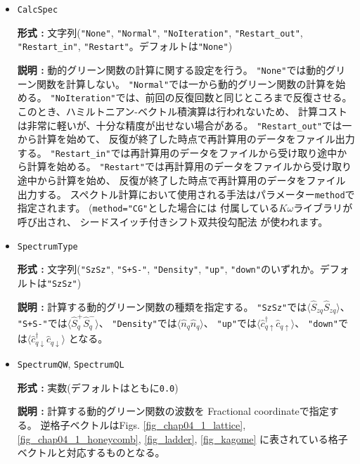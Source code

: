 \begin{itemize}
\item \verb|CalcSpec|
  
  {\bf 形式 :} 文字列(\verb|"None"|, \verb|"Normal"|, \verb|"NoIteration"|,  
  \verb|"Restart_out"|, \verb|"Restart_in"|, \verb|"Restart"|。デフォルトは\verb|"None"|)

  {\bf 説明 :} 動的グリーン関数の計算に関する設定を行う。
  \verb|"None"|では動的グリーン関数を計算しない。
  \verb|"Normal"|では一から動的グリーン関数の計算を始める。
  \verb|"NoIteration"|では、前回の反復回数と同じところまで反復させる。
  このとき、ハミルトニアン-ベクトル積演算は行われないため、
  計算コストは非常に軽いが、十分な精度が出せない場合がある。
  \verb|"Restart_out"|では一から計算を始めて、
  反復が終了した時点で再計算用のデータをファイル出力する。
  \verb|"Restart_in"|では再計算用のデータをファイルから受け取り途中から計算を始める。
  \verb|"Restart"|では再計算用のデータをファイルから受け取り途中から計算を始め、
  反復が終了した時点で再計算用のデータをファイル出力する。
  スペクトル計算において使用される手法はパラメーター\verb|method|で指定されます。
  (\verb|method="CG"|とした場合には
  付属している$K\omega$ライブラリ\cite{komega}が呼び出され、
  シードスイッチ付きシフト双共役勾配法
  \cite{Frommer2003,doi:10.1143/JPSJ.77.114713}が使われます。

\item \verb|SpectrumType|
  
  {\bf 形式 :} 文字列(\verb|"SzSz"|, \verb|"S+S-"|, \verb|"Density"|,  
  \verb|"up"|, \verb|"down"|のいずれか。デフォルトは\verb|"SzSz"|)

  {\bf 説明 :} 計算する動的グリーン関数の種類を指定する。
  \verb|"SzSz"|では$\langle {\hat S}_{z q} {\hat S}_{z q}\rangle$、
  \verb|"S+S-"|では$\langle {\hat S}^{+}_{q} {\hat S}^{-}_{q}\rangle$、
  \verb|"Density"|では$\langle {\hat n}_{q} {\hat n}_{q}\rangle$、
  \verb|"up"|では$\langle {\hat c}^{\dagger}_{q \uparrow} {\hat c}_{q \uparrow}\rangle$、
  \verb|"down"|では$\langle {\hat c}^{\dagger}_{q \downarrow} {\hat c}_{q \downarrow}\rangle$
  となる。

\item \verb|SpectrumQW|, \verb|SpectrumQL|
  
  {\bf 形式 :} 実数(デフォルトはともに\verb|0.0|)

  {\bf 説明 :} 計算する動的グリーン関数の波数を
  Fractional coordinateで指定する。
  逆格子ベクトルはFigs.
  \ref{fig_chap04_1_lattice}, \ref{fig_chap04_1_honeycomb},
  \ref{fig_ladder}, \ref{fig_kagome}
  に表されている格子ベクトルと対応するものとなる。


\end{itemize}
